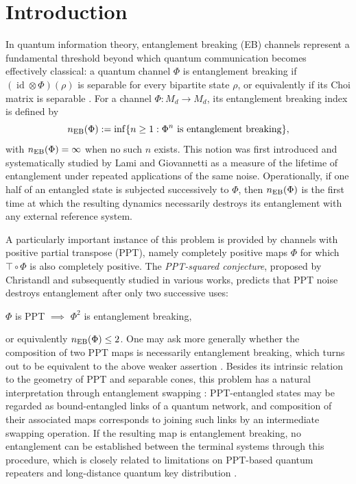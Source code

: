 \documentclass[11pt,reqno]{amsart}
\theoremstyle{definition}
\theoremstyle{definition}
\theoremstyle{definition}
\theoremstyle{definition}
\begin{document}
\section{Introduction}
{
In quantum information theory, entanglement breaking (EB) channels represent a fundamental threshold beyond which quantum communication becomes effectively classical: a quantum channel $\Phi$ is entanglement breaking if $(\operatorname{id}\otimes\Phi)(\rho)$ is separable for every bipartite state $\rho$, or equivalently if its Choi matrix is separable \cite{HSR03}. For a channel $\Phi:M_d\to M_d$, its entanglement breaking index is defined by
    $$n_{\rm EB}(\Phi):=\inf \{n\geq 1:\Phi^n\ {\rm is\ entanglement\ breaking}\},$$
with $n_{\rm EB}(\Phi)=\infty$ when no such $n$ exists. This notion was first introduced and systematically studied by Lami and Giovannetti \cite{LG15,LG16} as a measure of the lifetime of entanglement under repeated applications of the same noise. Operationally, if one half of an entangled state is subjected successively to $\Phi$, then $n_{\rm EB}(\Phi)$ is the first time at which the resulting dynamics necessarily destroys its entanglement with any external reference system. 

A particularly important instance of this problem is provided by channels with positive partial transpose (PPT), namely completely positive maps $\Phi$ for which $\top\circ\Phi$ is also completely positive. The \emph{PPT-squared conjecture}, proposed by Christandl \cite{PPTsq} and subsequently studied in various works, predicts that PPT noise destroys entanglement after only two successive uses:
\begin{center}
    $\Phi$ is PPT \quad $\implies$ \quad $\Phi^2$ is entanglement breaking,
\end{center}
or equivalently $n_{\rm EB}(\Phi)\leq2$. One may ask more generally whether the composition of two PPT maps is necessarily entanglement breaking, which turns out to be equivalent to the above weaker assertion \cite{CMHW19}. Besides its intrinsic relation to the geometry of PPT and separable cones, this problem has a natural interpretation through entanglement swapping \cite{CF17}: PPT-entangled states may be regarded as bound-entangled links of a quantum network, and composition of their associated maps corresponds to joining such links by an intermediate swapping operation. If the resulting map is entanglement breaking, no entanglement can be established between the terminal systems through this procedure, which is closely related to limitations on PPT-based quantum repeaters and long-distance quantum key distribution \cite{BCHW15,AL26}.

}
\end{document}
